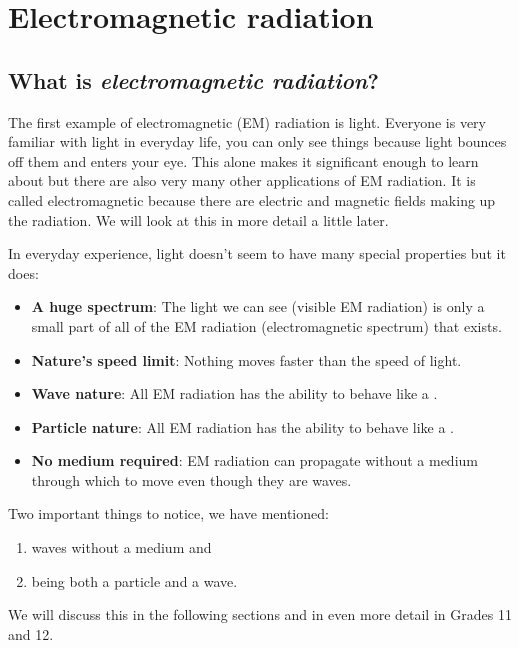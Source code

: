 \chapter{Electromagnetic radiation}
    \setcounter{figure}{1}
    \setcounter{subfigure}{1}
    \label{459e2bef85baf867f5850bc8338cad3a}
         \section{What is \textsl{electromagnetic radiation}?}
    \nopagebreak
  The first example of electromagnetic (EM) radiation is light. Everyone is very familiar with light in everyday life, you can only see things because light bounces off them and enters your eye. This alone makes it significant enough to learn about but there are also very many other applications of EM radiation. It is called electromagnetic because there are electric and magnetic fields making up the radiation. We will look at this in more detail a little later.

  In everyday experience, light doesn't seem to have many special properties but it does:
\begin{itemize}
 \item \textbf{A huge spectrum}: The light we can see (visible EM radiation) is only a small part of all of the EM radiation (electromagnetic spectrum) that exists.
 \item \textbf{Nature's speed limit}: Nothing moves faster than the speed of light. 
 \item \textbf{Wave nature}: All EM radiation has the ability to behave like a .
 \item \textbf{Particle nature}: All EM radiation has the ability to behave like a .
 \item \textbf{No medium required}: EM radiation can propagate without a medium through which to move even though they are waves.
\end{itemize}

Two important things to notice, we have mentioned:
\begin{enumerate}[noitemsep, label=\textbf{\arabic*}. ]
 \item waves without a medium and
 \item being both a particle and a wave.
\end{enumerate}
We will discuss this in the following sections and in even more detail in Grades 11 and 12.

